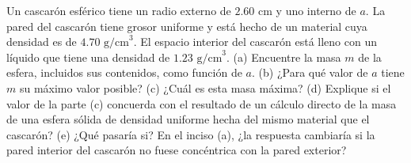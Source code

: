 \item Un cascarón esférico tiene un radio externo de $2.60 \text{ cm}$ y uno interno de $a$. La pared del cascarón tiene grosor uniforme y está hecho de un material cuya densidad es de $4.70 \text{ g/cm}^3$. El espacio interior del cascarón está lleno con un líquido que tiene una densidad de $1.23 \text{ g/cm}^3$. (a) Encuentre la masa $m$ de la esfera, incluidos sus contenidos, como función de $a$. (b) ¿Para qué valor de $a$ tiene $m$ su máximo valor posible? (c) ¿Cuál es esta masa máxima? (d) Explique si el valor de la parte (c) concuerda con el resultado de un cálculo directo de la masa de una esfera sólida de densidad uniforme hecha del mismo material que el cascarón? (e) ¿Qué pasaría si? En el inciso (a), ¿la respuesta cambiaría si la pared interior del cascarón no fuese concéntrica con la pared exterior?

